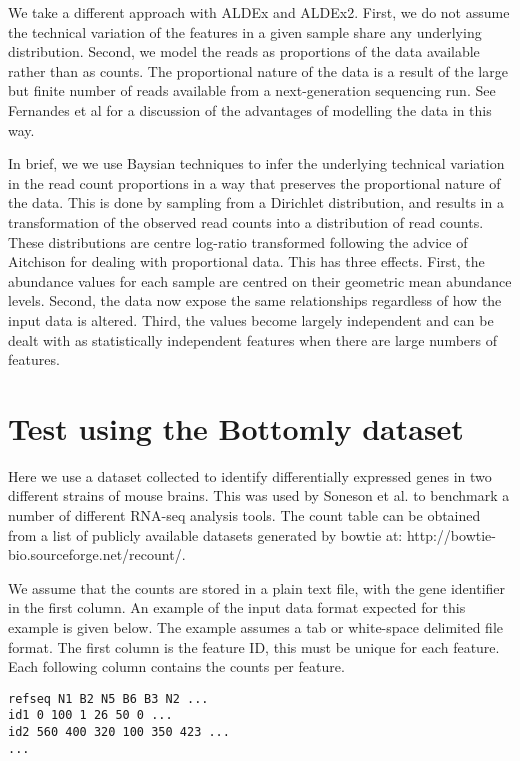 \documentclass[11pt]{amsart}
\begin{document}
We take a different approach with ALDEx and ALDEx2. First, we do not assume the technical variation of the features in a given sample share any underlying distribution. Second, we model the reads as proportions  of the data available rather than as counts. The proportional nature of the data is a result of the large but finite number of reads available from a next-generation sequencing run. See Fernandes et al\cite{fernandes:2013} for a discussion of the advantages of modelling the data in this way. 

In brief, we we use Baysian techniques to infer the underlying technical variation in the read count proportions in a way that preserves the proportional nature of the data. This is done by sampling from a Dirichlet distribution, and results in a transformation of the observed read counts into a distribution of read counts. These distributions are centre log-ratio transformed following the advice of Aitchison\cite{Aitchison:1986} for dealing with proportional data. This has three effects. First, the abundance values for each sample are centred on their geometric mean abundance levels. Second, the data now expose the same relationships regardless of how the input data is altered. Third, the values become largely independent and can be dealt with as statistically independent features when there are large numbers of features.  


\section{Test using the Bottomly dataset\cite{Bottomly:2011}}

Here we use a dataset collected to identify differentially expressed genes in two different strains of mouse brains. This was used by Soneson et al. \cite{Soneson:2013} to benchmark a number of different RNA-seq analysis tools. The count table can be obtained from a list of  publicly available datasets generated by bowtie at: http://bowtie-bio.sourceforge.net/recount/.

We assume that the counts are stored in a plain text file, with the gene identifier in the first column. An example of the input data format expected for this example is given below. The example assumes a tab or white-space delimited file format. The first column is the feature ID, this must be unique for each feature. Each following column contains the counts per feature.
\begin{verbatim}
refseq N1 B2 N5 B6 B3 N2 ...
id1 0 100 1 26 50 0 ...
id2 560 400 320 100 350 423 ...
...
\end{verbatim}
\end{document}
